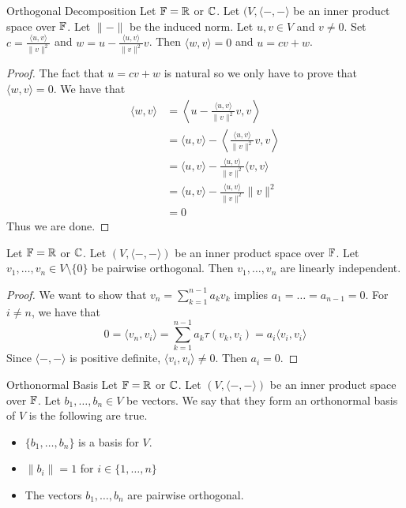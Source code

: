 \documentclass[a4paper]{article}
\begin{document}
\begin{thm}{Orthogonal Decomposition}{} Let $\mathbb{F}=\mathbb{R}$ or $\mathbb{C}$. Let $(V,\langle-,-\rangle$ be an inner product space over $\mathbb{F}$. Let $\|-\|$ be the induced norm. Let $u,v\in V$ and $v\neq 0$. Set $c=\frac{\langle u,v\rangle}{\|v\|^2}$ and $w=u-\frac{\langle u,v\rangle}{\|v\|^2}v$. Then $\langle w,v\rangle=0$ and $u=cv+w$. 
\begin{proof}
The fact that $u=cv+w$ is natural so we only have to prove that $\langle w,v\rangle=0$. We have that 
\begin{align*}
\langle w,v\rangle&=\left\langle u-\frac{\langle u,v\rangle}{\|v\|^2}v,v\right\rangle\\
&=\langle u,v\rangle-\left\langle \frac{\langle u,v\rangle}{\|v\|^2}v,v\right\rangle\\
&=\langle u,v\rangle-\frac{\langle u,v\rangle}{\|v\|^2}\langle v,v\rangle\\
&=\langle u,v\rangle-\frac{\langle u,v\rangle}{\|v\|^2}\|v\|^2\\
&=0
\end{align*}
Thus we are done. 
\end{proof}
\end{thm}

\begin{prp}{}{} Let $\mathbb{F}=\mathbb{R}$ or $\mathbb{C}$. Let $(V,\langle-,-\rangle)$ be an inner product space over $\mathbb{F}$. Let $v_1,\dots,v_n\in V\setminus\{0\}$ be pairwise orthogonal. Then $v_1,\dots,v_n$ are linearly independent.  
\begin{proof}
We want to show that $v_n=\sum_{k=1}^{n-1}a_kv_k$ implies $a_1=\dots=a_{n-1}=0$. For $i\neq n$, we have that $$0=\langle v_n, v_i\rangle=\sum_{k=1}^{n-1}a_k\tau(v_k,v_i)=a_i\langle v_i,v_i\rangle$$ Since $\langle-,-\rangle$ is positive definite, $\langle v_i,v_i\rangle\neq 0$. Then $a_i=0$. 
\end{proof}
\end{prp}

\begin{defn}{Orthonormal Basis}{} Let $\mathbb{F}=\mathbb{R}$ or $\mathbb{C}$. Let $(V,\langle-,-\rangle)$ be an inner product space over $\mathbb{F}$. Let $b_1,\dots,b_n\in V$ be vectors. We say that they form an orthonormal basis of $V$ is the following are true. 
\begin{itemize}
\item $\{b_1,\dots,b_n\}$ is a basis for $V$. 
\item $\|b_i\|=1$ for $i\in\{1,\dots,n\}$
\item The vectors $b_1,\dots,b_n$ are pairwise orthogonal. 
\end{itemize}
\end{defn}
\end{document}
